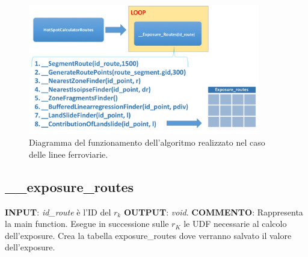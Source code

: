 \begin{figure}[h]
	\centering
	\includegraphics[width=0.9\textwidth]{images/algorithm2}
	\caption{Diagramma del funzionamento dell'algoritmo realizzato nel caso delle linee ferroviarie.}
	\label{diagramma_algoritmo2}
\end{figure}

\subsection{\_\_exposure\_routes}

\textbf{INPUT}: \textit{id\_route} è l'ID del $r_k$ \newline
\textbf{OUTPUT}: \textit{void}. \newline
\textbf{COMMENTO}: Rappresenta la main function. Esegue in successione sulle $r_K$ le UDF necessarie al calcolo dell’exposure. Crea la tabella exposure\_routes dove verranno salvato il valore dell’exposure.

